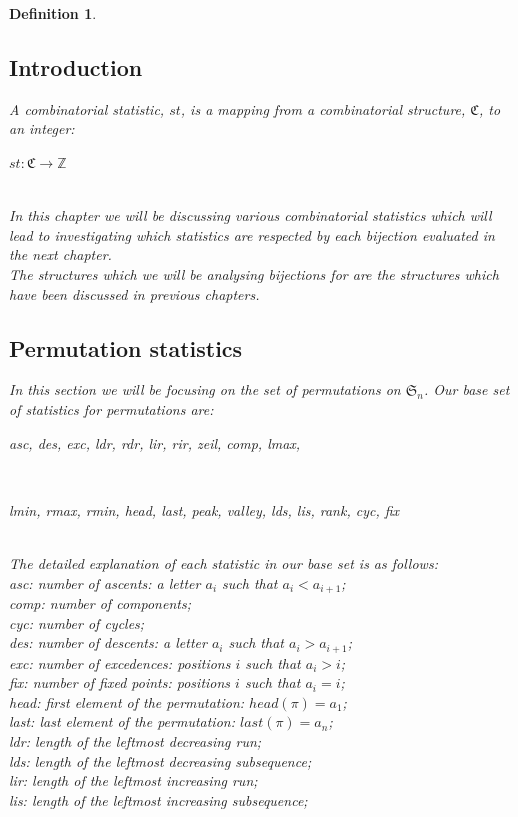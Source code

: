 \documentclass[12pt]{article}
\newtheorem{definition}{Definition}
\newcommand{\sym}{\mathfrak{S}}
\begin{document}
\begin{definition}
\subsection{Introduction}
A combinatorial statistic, $st$, is a mapping from a combinatorial structure, $\mathfrak{C}$, to an integer:\\
\centerline{$st: \mathfrak{C} \rightarrow \mathbb{Z}$}\\
In this chapter we will be discussing various combinatorial statistics which will lead to investigating which statistics are respected by each bijection evaluated in the next chapter.\\
The structures which we will be analysing bijections for are the structures which have been discussed in previous chapters.

\subsection{Permutation statistics}
In this section we will be focusing on the set of permutations on $\sym_n$. Our base set of statistics for permutations are:\\ \centerline{asc, des, exc, ldr, rdr, lir, rir, zeil, comp, lmax,}\\
\centerline{lmin, rmax, rmin, head, last, peak, valley, lds, lis, rank, cyc, fix}\\
The detailed explanation of each statistic in our base set is as follows:\\
asc: number of ascents: a letter $a_i$ such that $a_i < a_{i+1}$;\\
comp: number of components;\\
cyc: number of cycles;\\
des: number of descents: a letter $a_i$ such that $a_i > a_{i+1}$;\\
exc: number of excedences: positions $i$ such that $a_i > i$;\\
fix: number of fixed points: positions $i$ such that $a_i = i$;\\
head: first element of the permutation: $head(\pi) = a_1$;\\
last: last element of the permutation: $last(\pi) = a_n$;\\
ldr: length of the leftmost decreasing run;\\
lds: length of the leftmost decreasing subsequence;\\
lir: length of the leftmost increasing run;\\
lis: length of the leftmost increasing subsequence;\\

\end{definition}
\end{document}
